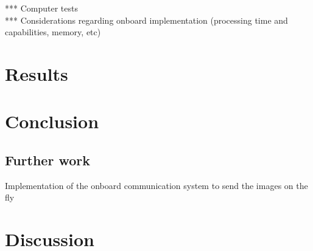 *** Computer tests\\
*** Considerations regarding onboard implementation (processing time and capabilities, memory, etc)\\
\section{Results} 
\section{Conclusion}
\subsection{Further work}
Implementation of the onboard communication system to send the images on the fly
\section{Discussion}
\newpage